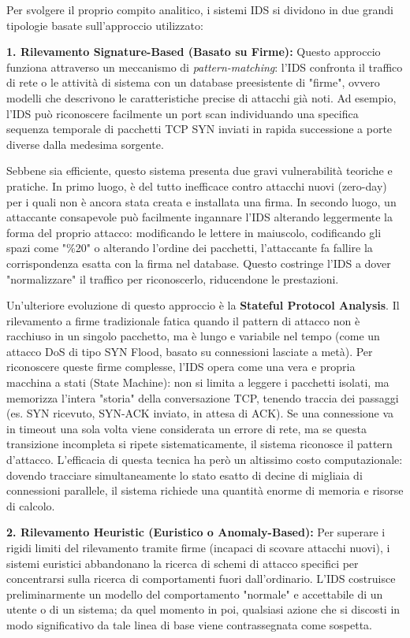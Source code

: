 \documentclass{article}
\begin{document}
Per svolgere il proprio compito analitico, i sistemi IDS si dividono in due grandi tipologie basate sull'approccio utilizzato:


\textbf{1. Rilevamento Signature-Based (Basato su Firme):} Questo approccio funziona attraverso un meccanismo di \textit{pattern-matching}: l'IDS confronta il traffico di rete o le attività di sistema con un database preesistente di "firme", ovvero modelli che descrivono le caratteristiche precise di attacchi già noti. Ad esempio, l'IDS può riconoscere facilmente un port scan individuando una specifica sequenza temporale di pacchetti TCP SYN inviati in rapida successione a porte diverse dalla medesima sorgente.

Sebbene sia efficiente, questo sistema presenta due gravi vulnerabilità teoriche e pratiche. In primo luogo, è del tutto inefficace contro attacchi nuovi (zero-day) per i quali non è ancora stata creata e installata una firma. In secondo luogo, un attaccante consapevole può facilmente ingannare l'IDS alterando leggermente la forma del proprio attacco: modificando le lettere in maiuscolo, codificando gli spazi come "\%20" o alterando l'ordine dei pacchetti, l'attaccante fa fallire la corrispondenza esatta con la firma nel database. Questo costringe l'IDS a dover "normalizzare" il traffico per riconoscerlo, riducendone le prestazioni.

Un'ulteriore evoluzione di questo approccio è la \textbf{Stateful Protocol Analysis}. Il rilevamento a firme tradizionale fatica quando il pattern di attacco non è racchiuso in un singolo pacchetto, ma è lungo e variabile nel tempo (come un attacco DoS di tipo SYN Flood, basato su connessioni lasciate a metà). Per riconoscere queste firme complesse, l'IDS opera come una vera e propria macchina a stati (State Machine): non si limita a leggere i pacchetti isolati, ma memorizza l'intera "storia" della conversazione TCP, tenendo traccia dei passaggi (es. SYN ricevuto, SYN-ACK inviato, in attesa di ACK). Se una connessione va in timeout una sola volta viene considerata un errore di rete, ma se questa transizione incompleta si ripete sistematicamente, il sistema riconosce il pattern d'attacco. L'efficacia di questa tecnica ha però un altissimo costo computazionale: dovendo tracciare simultaneamente lo stato esatto di decine di migliaia di connessioni parallele, il sistema richiede una quantità enorme di memoria e risorse di calcolo.

\textbf{2. Rilevamento Heuristic (Euristico o Anomaly-Based):} Per superare i rigidi limiti del rilevamento tramite firme (incapaci di scovare attacchi nuovi), i sistemi euristici abbandonano la ricerca di schemi di attacco specifici per concentrarsi sulla ricerca di comportamenti fuori dall'ordinario. L'IDS costruisce preliminarmente un modello del comportamento "normale" e accettabile di un utente o di un sistema; da quel momento in poi, qualsiasi azione che si discosti in modo significativo da tale linea di base viene contrassegnata come sospetta.
\end{document}
